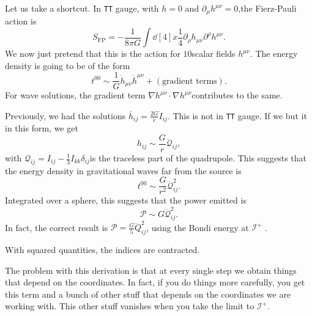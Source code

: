 Let us take a shortcut. In \texttt{TT} gauge, with $h = 0$ and $\partial_{\mu} h^{\mu\nu} = 0$,the Fierz-Pauli action is 
\begin{equation}
  S_{\text{FP}} = -\frac{1}{8 \pi G} \int \dd[4]{x} \frac{1}{4} \partial_{\rho} h_{\mu\nu} \partial^{\rho} h^{\mu\nu}.
\end{equation}
We now just pretend that this is the action for $10$scalar fields $h^{\mu\nu}$.
The energy density is going to be of the form
\begin{equation}
  t^{00} \sim \frac{1}{G} \dot{h}_{\mu\nu} \dot{h}^{\mu\nu} + (\text{gradient terms}).
\end{equation}
For wave solutions, the gradient term $\nabla h^{\mu\nu} \cdot \nabla h^{\mu\nu}$contributes to the same.

Previously, we had the solutions $\overline{h}_{ij} = \frac{2G}{r} \ddot{I}_{ij}$. This is not in \texttt{TT} gauge. If we but it in this form, we get
\begin{equation}
  h_{ij} \sim \frac{G}{r} \ddot{\mathcal{Q}}_{ij},
\end{equation}
with $\mathcal{Q}_{ij} = I_{ij} - \frac{1}{3} I_{kk} \delta_{ij}$is the traceless part of the quadrupole.
This suggests that the energy density in gravitational waves far from the source is
\begin{equation}
  t^{00} \sim \frac{G}{r^2} \dddot{\mathcal{Q}}_{ij}^2.
\end{equation}
Integrated over a sphere, this suggests that the power emitted is
\begin{equation}
  \mathcal{P} \sim G \dddot{\mathcal{Q}}^2_{ij}.
\end{equation}
In fact, the correct result is $\mathcal{P} = \frac{G}{5} \dddot{Q}^2_{ij}$, using the Bondi energy at $\mathscr{I}^+$ .
\begin{leftbar}
  \begin{note}
    With squared quantities, the indices are contracted.
  \end{note}
\end{leftbar}

\begin{remark}
  The problem with this derivation is that at every single step we obtain things that depend on the coordinates.
  In fact, if you do things more carefully, you get this term and a bunch of other stuff that depends on the coordinates we are working with. This other stuff vanishes when you take the limit to $\mathscr{I}^+$.
\end{remark}

